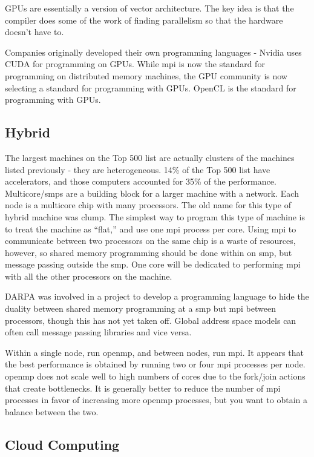 \documentclass[10pt]{article}
\begin{document}
\begin{flushleft}
GPUs are essentially a version of vector architecture. The key idea is that the compiler does some of the work of finding parallelism so that the hardware doesn't have to. 

Companies originally developed their own programming languages - Nvidia uses CUDA for programming on GPUs. While \gls{mpi} is now the standard for programming on distributed memory machines, the GPU community is now selecting a standard for programming with GPUs. OpenCL is the standard for programming with GPUs. 

\subsection{Hybrid}

The largest machines on the Top 500 list are actually clusters of the machines listed previously - they are heterogeneous. 14\% of the Top 500 list have accelerators, and those computers accounted for 35\% of the performance. Multicore/\gls{smp}s are a building block for a larger machine with a network. Each node is a multicore chip with many processors. The old name for this type of hybrid machine was \gls{clump}. The simplest way to program this type of machine is to treat the machine as ``flat,'' and use one \gls{mpi} process per core. Using \gls{mpi} to communicate between two processors on the same chip is a waste of resources, however, so shared memory programming should be done within on \gls{smp}, but message passing outside the \gls{smp}. One core will be dedicated to performing \gls{mpi} with all the other processors on the machine. 

DARPA was involved in a project to develop a programming language to hide the duality between shared memory programming at a \gls{smp} but \gls{mpi} between processors, though this has not yet taken off. Global address space models can often call message passing libraries and vice versa. 

Within a single node, run \gls{openmp}, and between nodes, run \gls{mpi}. It appears that the best performance is obtained by running two or four \gls{mpi} processes per node. \gls{openmp} does not scale well to high numbers of cores due to the fork/join actions that create bottlenecks. It is generally better to reduce the number of \gls{mpi} processes in favor of increasing more \gls{openmp} processes, but you want to obtain a balance between the two.

\subsection{Cloud Computing}


\end{flushleft}
\end{document}
